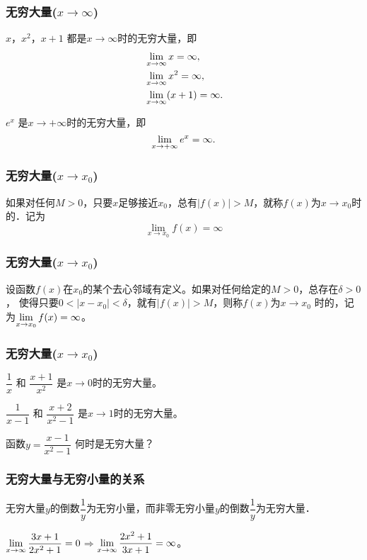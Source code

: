 \documentclass[14pt,notheorems,leqno,xcolor={rgb}]{beamer} %
\begin{document}
\begin{frame}
\frametitle{无穷大量($x\to\infty$)}
\begin{example}
$x$，$x^2$，$x+1$ 都是$x\to\infty$时的无穷大量，即
\begin{align*}
  &\lim\limits_{x\to\infty} x = \infty, \\
  &\lim\limits_{x\to\infty} x^2 = \infty, \\
  &\lim\limits_{x\to\infty}(x+1) = \infty.
\end{align*}
\end{example}
\vpause
\begin{example}
$e^x$ 是$x\to+\infty$时的无穷大量，即
\[ \lim\limits_{x\to+\infty} e^x = \infty. \]
\end{example}
\end{frame}

\begin{oframe}
\frametitle{无穷大量($x\to x_0$)}
如果对任何$M>0$，只要$x$足够接近$x_0$，总有$|f(x)|>M$，就称$f(x)$为$x\to x_0$时的．记为
$$\lim_{x\to x_0}f(x)=\infty$$
\end{oframe}

\begin{iframe}
\frametitle{无穷大量($x\to x_0$)}
\begin{definition*}
设函数$f(x)$在$x_0$的某个去心邻域有定义。如果对任何给定的$M>0$，总存在$\delta>0$，
使得只要$0<|x-x_0|<\delta$，就有$|f(x)|>M$，则称$f(x)$为$x\to x_0$ 时的，记为$\lim\limits_{x\to x_0}f(x)=\infty$。
\end{definition*}
\end{iframe}

\begin{frame}
\frametitle{无穷大量($x\to x_0$)}
\begin{example}
$\dfrac1{x}$ 和 $\dfrac{x+1}{x^2}$ 是$x\to 0$时的无穷大量。
\end{example}
\vpause
\begin{example}
$\dfrac1{x-1}$ 和 $\dfrac{x+2}{x^2-1}$ 是$x\to 1$时的无穷大量。
\end{example}
\vpause
\begin{example}
函数$y=\dfrac{x-1}{x^2-1}$ 何时是无穷大量？
\end{example}
\end{frame}

\begin{frame}
\frametitle{无穷大量与无穷小量的关系}
\begin{theorem}
无穷大量$y$的倒数$\dfrac1y$为无穷小量，而非零无穷小量$y$的倒数$\dfrac1y$为无穷大量．
\end{theorem}
\pause
\begin{example}
$\lim\limits_{x\to\infty}\dfrac{3x+1}{2x^2+1}=0$\quad$\Longrightarrow$\quad$\lim\limits_{x\to\infty}\dfrac{2x^2+1}{3x+1}=\infty$。
\end{example}
\end{frame}
\end{document}
